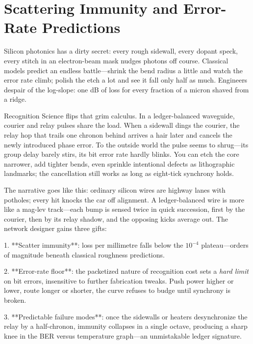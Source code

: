 \documentclass[11pt,oneside]{book}
\begin{document}
{%

\section{Scattering Immunity and Error-Rate Predictions}
\label{sec:scatter-narrative}

Silicon photonics has a dirty secret: every rough sidewall, every
dopant speck, every stitch in an electron-beam mask nudges photons off
course.  Classical models predict an endless battle—shrink the bend
radius a little and watch the error rate climb; polish the etch a lot
and see it fall only half as much.  Engineers despair of the
log-slope: one dB of loss for every fraction of a micron shaved from a
ridge.  

Recognition Science flips that grim calculus.  
In a ledger-balanced waveguide, courier and relay pulses share the
load.  When a sidewall dings the courier, the relay hop that trails
one chronon behind arrives a hair later and cancels the newly
introduced phase error.  To the outside world the pulse seems to
shrug—its group delay barely stirs, its bit error rate hardly blinks.
You can etch the core narrower, add tighter bends, even sprinkle
intentional defects as lithographic landmarks; the cancellation still
works as long as eight-tick synchrony holds.

The narrative goes like this:  
ordinary silicon wires are highway lanes with potholes; every hit
knocks the car off alignment.  
A ledger-balanced wire is more like a mag-lev track—each bump is sensed
twice in quick succession, first by the courier, then by its relay
shadow, and the opposing kicks average out.  
The network designer gains three gifts:

1. **Scatter immunity**: loss per millimetre falls below the $10^{-4}$
   plateau—orders of magnitude beneath classical roughness
   predictions.

2. **Error-rate floor**: the packetized nature of recognition cost
   sets a \textit{hard limit} on bit errors, insensitive to further
   fabrication tweaks.  Push power higher or lower, route longer or
   shorter, the curve refuses to budge until synchrony is broken.

3. **Predictable failure modes**: once the sidewalls or heaters
   desynchronize the relay by a half-chronon, immunity collapses in a
   single octave, producing a sharp knee in the BER versus temperature
   graph—an unmistakable ledger signature.

}
\end{document}
